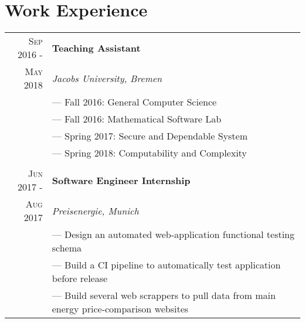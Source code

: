 \documentclass[a4paper,10pt]{article}
\begin{document}
	\section{Work Experience}
	\begin{tabular}{r|l}
		\textsc{Sep 2016 - } & \textbf{Teaching Assistant} \\\textsc{May 2018}&\emph{Jacobs University, Bremen}
		\\& --- Fall 2016: General Computer Science 
		\\& --- Fall 2016: Mathematical Software Lab
		\\& --- Spring 2017: Secure and Dependable System
		\\& --- Spring 2018: Computability and Complexity
		\\ \multicolumn{1}{c}{} \\
		\textsc{Jun 2017 - } & \textbf{Software Engineer Internship} \\\textsc{Aug 2017}&\emph{Preisenergie, Munich}
		\\& --- Design an automated web-application functional testing schema
		\\& --- Build a CI pipeline to automatically test application before release
		\\& --- Build several web scrappers to pull data from main energy price-comparison websites
	\end{tabular}
	
\end{document}

